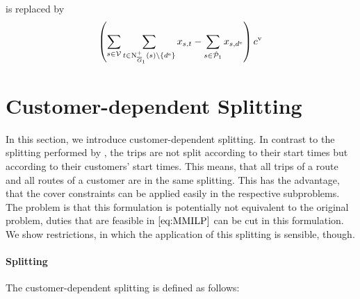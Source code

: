 is replaced by
\begin{align*}
	\left(\sum_{s\in\mathcal{V}} \sum_{t\in\operatorname{N}^+_{\overline{G}_1}(s)\backslash\left\{d^{\operatorname{e}}\right\}} x_{s,t} - \sum_{s\in\hat{\mathcal{P}}_1} x_{s,d^{\operatorname{e}}}\right)c^{\operatorname{v}}
\end{align*}


\section{Customer-dependent Splitting}
\label{sec:customer_dependent_splitting}

In this section, we introduce customer-dependent splitting. In contrast to the splitting performed by \cite{Knoll}, the trips are not split according to their start times but according to their customers' start times. This means, that all trips of a route and all routes of a customer are in the same splitting. This has the advantage, that the cover constraints can be applied easily in the respective subproblems. The problem is that this formulation is potentially not equivalent to the original problem, \ie duties that are feasible in $\eqref{eq:MMILP}$ can be cut in this formulation. We show restrictions, in which the application of this splitting is sensible, though. 

\paragraph{Splitting} \parfill

The customer-dependent splitting is defined as follows:

